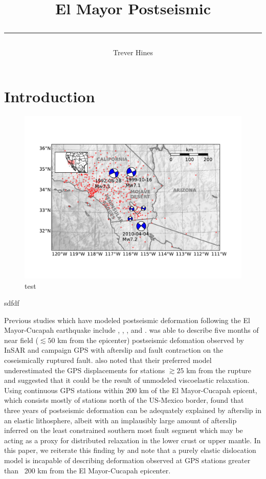 \documentclass[12pt]{article}
\title{	
El Mayor Postseismic
\author{Trever Hines}
\rule{\headwidth}{1.0pt}
}
\begin{document}
\maketitle
\section*{Introduction}
\begin{figure}
\includegraphics[scale=0.2]{Figures/ContextMap}
\centering
\caption{test}
\end{figure}
  sdfdf
    
Previous studies which have modeled postseismic deformation following the El Mayor-Cucapah earthquake include \cite{Pollitz2012}, \cite{Gonzalez-ortega2014}, \cite{Spinler2015}, and \cite{Rollins2015}. \cite{Gonzalez-ortega2014} was able to describe five months of near field ($\lesssim 50$ km from the epicenter) postseismic defomation observed by InSAR and campaign GPS with afterslip and fault contraction on the coseismically ruptured fault. \cite{Gonzalez-ortega2014} also noted that their preferred model underestimated the GPS displacements for stations $\gtrsim 25$ km from the rupture and suggested that it could be the result of unmodeled viscoelastic relaxation.  Using continuous GPS stations within 200 km of the El Mayor-Cucapah epicent, which consists mostly of stations north of the US-Mexico border, \cite{Rollins2015} found that three years of postseismic deformation can be adequately explained by afterslip in an elastic lithosphere, albeit with an implausibly large amount of afterslip inferred on the least constrained southern most fault segment which may be acting as a proxy for distributed relaxation in the lower crust or upper mantle. In this paper, we reiterate this finding by \cite{Rollins2015} and note that a purely elastic dislocation model is incapable of describing deformation observed at GPS stations greater than ~200 km from the El Mayor-Cucapah epicenter.  
\end{document}
